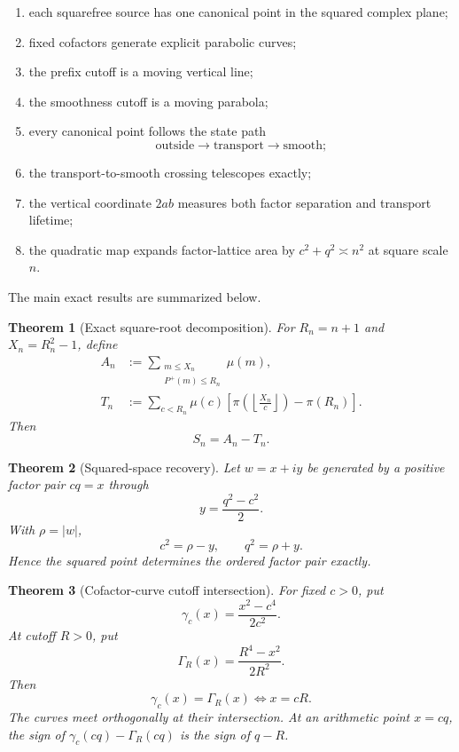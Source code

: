 \documentclass[11pt]{article}
\newtheorem{theorem}{Theorem}[section]
\theoremstyle{definition}
\theoremstyle{remark}
\newcommand{\Pplus}{P^{+}}
\newcommand{\1}{\mathbf{1}}
\begin{document}
\begin{enumerate}[leftmargin=1.7em,itemsep=0.35em]
\item each squarefree source has one canonical point in the squared complex plane;
\item fixed cofactors generate explicit parabolic curves;
\item the prefix cutoff is a moving vertical line;
\item the smoothness cutoff is a moving parabola;
\item every canonical point follows the state path
\[
 \text{outside}\longrightarrow\text{transport}\longrightarrow\text{smooth};
\]
\item the transport-to-smooth crossing telescopes exactly;
\item the vertical coordinate $2ab$ measures both factor separation and transport lifetime;
\item the quadratic map expands factor-lattice area by $c^2+q^2\asymp n^2$ at square scale $n$.
\end{enumerate}

The main exact results are summarized below.

\begin{theorem}[Exact square-root decomposition]
\label{thm:intro-decomposition}
For $R_n=n+1$ and $X_n=R_n^2-1$, define
\begin{align*}
 A_n&:=\sum_{\substack{m\le X_n\\\Pplus(m)\le R_n}}\mu(m),\\
 T_n&:=\sum_{c<R_n}\mu(c)
 \left[
 \pi\!\left(\left\lfloor\frac{X_n}{c}\right\rfloor\right)-\pi(R_n)
 \right].
\end{align*}
Then
\[
 \boxed{S_n=A_n-T_n.}
\]
\end{theorem}

\begin{theorem}[Squared-space recovery]
\label{thm:intro-recovery}
Let $w=x+iy$ be generated by a positive factor pair $cq=x$ through
\[
 y=\frac{q^2-c^2}{2}.
\]
With $\rho=|w|$,
\[
 \boxed{c^2=\rho-y,\qquad q^2=\rho+y.}
\]
Hence the squared point determines the ordered factor pair exactly.
\end{theorem}

\begin{theorem}[Cofactor-curve cutoff intersection]
\label{thm:intro-intersection}
For fixed $c>0$, put
\[
 \gamma_c(x)=\frac{x^2-c^4}{2c^2}.
\]
At cutoff $R>0$, put
\[
 \Gamma_R(x)=\frac{R^4-x^2}{2R^2}.
\]
Then
\[
 \boxed{\gamma_c(x)=\Gamma_R(x)\iff x=cR.}
\]
The curves meet orthogonally at their intersection.  At an arithmetic point $x=cq$, the sign of $\gamma_c(cq)-\Gamma_R(cq)$ is the sign of $q-R$.
\end{theorem}
\end{document}

